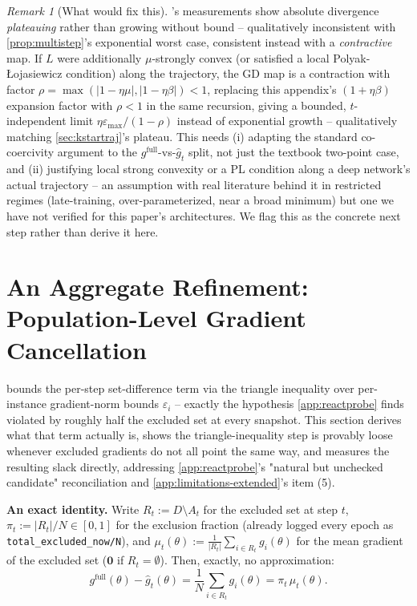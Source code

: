 \documentclass{article}
\theoremstyle{plain}
\theoremstyle{definition}
\theoremstyle{remark}
\newtheorem{remark}[theorem]{Remark}
\begin{document}
\begin{remark}[What would fix this]
\label{rem:contraction-direction}
's measurements show absolute divergence \emph{plateauing} rather than growing without bound -- qualitatively inconsistent with \cref{prop:multistep}'s exponential worst case, consistent instead with a \emph{contractive} map. If $L$ were additionally $\mu$-strongly convex (or satisfied a local Polyak-\L{}ojasiewicz condition) along the trajectory, the GD map is a contraction with factor $\rho=\max(|1-\eta\mu|,|1-\eta\beta|)<1$, replacing this appendix's $(1+\eta\beta)$ expansion factor with $\rho<1$ in the same recursion, giving a bounded, $t$-independent limit $\eta\varepsilon_{\max}/(1-\rho)$ instead of exponential growth -- qualitatively matching \cref{sec:kstartraj}'s plateau. This needs (i) adapting the standard co-coercivity argument to the $g^{\mathrm{full}}$-vs-$\hat g_t$ split, not just the textbook two-point case, and (ii) justifying local strong convexity or a PL condition along a deep network's actual trajectory -- an assumption with real literature behind it in restricted regimes (late-training, over-parameterized, near a broad minimum) but one we have not verified for this paper's architectures. We flag this as the concrete next step rather than derive it here.
\end{remark}

\section{An Aggregate Refinement: Population-Level Gradient Cancellation}
\label{app:aggregate}

 bounds the per-step set-difference term via the triangle inequality over per-instance gradient-norm bounds $\varepsilon_i$ -- exactly the hypothesis \cref{app:reactprobe} finds violated by roughly half the excluded set at every snapshot. This section derives what that term actually is, shows the triangle-inequality step is provably loose whenever excluded gradients do not all point the same way, and measures the resulting slack directly, addressing \cref{app:reactprobe}'s "natural but unchecked candidate" reconciliation and \cref{app:limitations-extended}'s item (5).

\textbf{An exact identity.} Write $R_t := D\setminus A_t$ for the excluded set at step $t$, $\pi_t := |R_t|/N \in[0,1]$ for the exclusion fraction (already logged every epoch as \texttt{total\_excluded\_now/N}), and $\mu_t(\theta) := \frac{1}{|R_t|}\sum_{i\in R_t} g_i(\theta)$ for the mean gradient of the excluded set ($\mathbf0$ if $R_t=\emptyset$). Then, exactly, no approximation:
\begin{equation}
\label{eq:aggidentity}
g^{\mathrm{full}}(\theta) - \hat g_t(\theta) = \frac1N\sum_{i\in R_t} g_i(\theta) = \pi_t\,\mu_t(\theta).
\end{equation}
\end{document}
